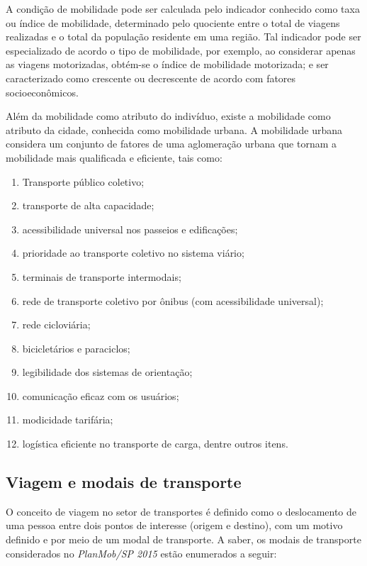 \documentclass[
	12pt,				%
	oneside,			%
	a4paper,			%
	english,			%
	brazil				%
	]{abntex2ppgsi}
\begin{document}
A condição de mobilidade pode ser calculada pelo indicador conhecido como taxa ou índice de mobilidade, determinado pelo quociente entre o total de viagens realizadas e o total da população residente em uma região. Tal indicador pode ser especializado de acordo o tipo de mobilidade, por exemplo, ao considerar apenas as viagens motorizadas, obtém-se o índice de mobilidade motorizada; e ser caracterizado como crescente ou decrescente de acordo com fatores socioeconômicos.

Além da mobilidade como atributo do indivíduo, existe a mobilidade como atributo da cidade, conhecida como mobilidade urbana. A mobilidade urbana considera um conjunto de fatores de uma aglomeração urbana que tornam a mobilidade mais qualificada e eficiente, tais como: \begin{enumerate}
\item Transporte público coletivo;
\item  transporte de alta capacidade;
\item  acessibilidade universal nos passeios e edificações;
\item prioridade ao transporte coletivo no sistema viário;
\item terminais de transporte intermodais;
\item rede de transporte coletivo por ônibus (com acessibilidade universal);
\item rede cicloviária;
\item bicicletários e paraciclos;
\item  legibilidade dos sistemas de orientação;
\item comunicação eficaz com os usuários;
\item modicidade tarifária;
\item  logística eficiente no transporte de carga, dentre outros itens.
\end{enumerate} 

\subsection{Viagem e modais de transporte}

O conceito de viagem no setor de transportes é definido como o deslocamento de uma pessoa entre dois pontos de interesse (origem e destino), com um motivo definido e por meio de um modal de transporte.  A saber, os modais de transporte considerados no \textit{PlanMob/SP 2015} estão enumerados a seguir:
\end{document}
